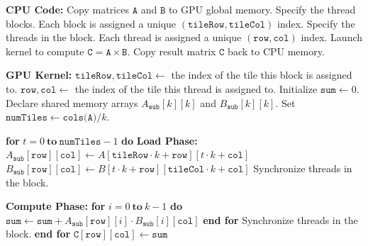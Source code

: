 \documentclass{article}
\begin{document}
\begin{algorithm}[H]
\caption{Tiled Matrix Multiplication on a GPU}
\label{alg:tiled_matrix_multiplication}
\begin{algorithmic}
    \State \textbf{CPU Code:}
    \State \quad Copy matrices \(\texttt{A}\) and \(\texttt{B}\) to GPU global memory.
    \State \quad Specify the thread blocks. Each block is assigned a unique \((\texttt{tileRow}, \texttt{tileCol})\) index.
    \State \quad Specify the threads in the block. Each thread is assigned a unique \((\texttt{row}, \texttt{col})\) index.
    \State \quad Launch kernel to compute \(\texttt{C} = \texttt{A} \times \texttt{B}\).
    \State \quad Copy result matrix \(\texttt{C}\) back to CPU memory.

    \vspace{\baselineskip}
    \State \textbf{GPU Kernel:}
    \State \quad \(\texttt{tileRow}, \texttt{tileCol} \gets\) the index of the tile this block is assigned to.
    \State \quad \(\texttt{row}, \texttt{col} \gets\) the index of the tile this thread is assigned to.
    \State \quad Initialize \(\texttt{sum} \gets 0\).
    \State \quad Declare shared memory arrays \(A_{\texttt{sub}}[k][k]\) and \(B_{\texttt{sub}}[k][k]\).
    \State \quad Set \(\texttt{numTiles} \gets \texttt{cols(A)} / k\).

    \vspace{0.5\baselineskip}
    \State \quad \textbf{for } \(t = 0 \ \textbf{to}\ \texttt{numTiles} - 1\) \textbf{ do}
    \State \quad \quad \textbf{Load Phase:}
    \State \quad \quad \quad $A_{\texttt{sub}}[\texttt{row}][\texttt{col}] \gets A[\texttt{tileRow} \cdot k + \texttt{row}][t \cdot k + \texttt{col}]$
    \State \quad \quad \quad $B_{\texttt{sub}}[\texttt{row}][\texttt{col}] \gets B[t \cdot k + \texttt{row}][\texttt{tileCol} \cdot k + \texttt{col}]$
    \State \quad \quad \quad Synchronize threads in the block.

    \vspace{0.5\baselineskip}
    \State \quad \quad \textbf{Compute Phase:}
    \State \quad \quad \quad \textbf{for } \(i = 0 \ \textbf{to}\ k - 1\) \textbf{ do}
    \State \quad \quad \quad \quad \(\texttt{sum} \gets \texttt{sum} + A_{\texttt{sub}}[\texttt{row}][i] \cdot B_{\texttt{sub}}[i][\texttt{col}]\)
    \State \quad \quad \quad \textbf{end for}
    \State \quad \quad \quad Synchronize threads in the block.
    \State \quad \textbf{end for}
    \vspace{0.5\baselineskip}
    \State \quad \(\texttt{C}[\texttt{row}][\texttt{col}] \gets \texttt{sum}\)

\end{algorithmic}
\end{algorithm}
\end{document}
